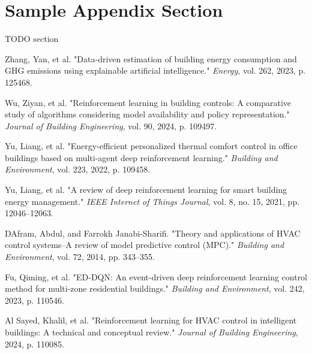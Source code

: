 \documentclass[preprint,12pt]{elsarticle}
\begin{document}
\appendix

\section{Sample Appendix Section}
\label{sec:sample:appendix}
TODO section %
%   
%  


\begin{thebibliography}{16}

Zhang, Yan, et al. "Data-driven estimation of building energy consumption and GHG emissions using explainable artificial intelligence." \textit{Energy}, vol. 262, 2023, p. 125468.
    
Wu, Ziyan, et al. "Reinforcement learning in building controls: A comparative study of algorithms considering model availability and policy representation." \textit{Journal of Building Engineering}, vol. 90, 2024, p. 109497.
    
Yu, Liang, et al. "Energy-efficient personalized thermal comfort control in office buildings based on multi-agent deep reinforcement learning." \textit{Building and Environment}, vol. 223, 2022, p. 109458.
    
Yu, Liang, et al. "A review of deep reinforcement learning for smart building energy management." \textit{IEEE Internet of Things Journal}, vol. 8, no. 15, 2021, pp. 12046–12063.
    
DAfram, Abdul, and Farrokh Janabi-Sharifi. "Theory and applications of HVAC control systems–A review of model predictive control (MPC)." \textit{Building and Environment}, vol. 72, 2014, pp. 343–355.
    
Fu, Qiming, et al. "ED-DQN: An event-driven deep reinforcement learning control method for multi-zone residential buildings." \textit{Building and Environment}, vol. 242, 2023, p. 110546.
    
Al Sayed, Khalil, et al. "Reinforcement learning for HVAC control in intelligent buildings: A technical and conceptual review." \textit{Journal of Building Engineering}, 2024, p. 110085.


\end{thebibliography}
\end{document}
